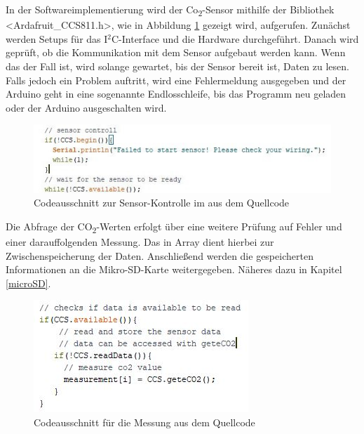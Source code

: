 In der Softwareimplementierung wird der Co\textsubscript{2}-Sensor mithilfe der Bibliothek <Ardafruit\_CCS811.h>, wie in Abbildung \ref{fig:Setup} gezeigt wird, aufgerufen. Zunächst werden Setups für das I$^2$C-Interface und die Hardware durchgeführt. Danach wird geprüft, ob die Kommunikation mit dem Sensor aufgebaut werden kann. Wenn das der Fall ist, wird solange gewartet, bis der Sensor bereit ist, Daten zu lesen. Falls jedoch ein Problem auftritt, wird eine Fehlermeldung ausgegeben und der Arduino geht in eine sogenannte Endlosschleife, bis das Programm neu geladen oder der Arduino ausgeschalten wird.

\begin{figure}[!hbt]
	\centering
	\includegraphics[width=0.9\linewidth]{Images/ccs811Setup}
	\caption{Codeausschnitt zur Sensor-Kontrolle im aus dem Quellcode}
	\label{fig:Setup}
\end{figure}

Die Abfrage der CO\textsubscript{2}-Werten erfolgt über eine weitere Prüfung auf Fehler und einer darauffolgenden Messung. Das in Array dient hierbei zur Zwischenspeicherung der Daten. Anschließend werden die gespeicherten Informationen an die Mikro-SD-Karte weitergegeben. Näheres dazu in Kapitel \ref{microSD}.

\begin{figure}[!hbt]
	\centering
	\includegraphics[width=0.5\linewidth]{Images/ccs811Loop}
	\caption{Codeausschnitt für die Messung aus dem Quellcode}
	\label{fig:Loop}
\end{figure}

